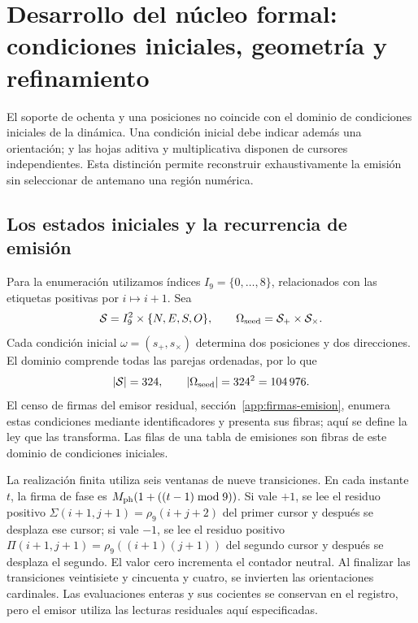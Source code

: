 \section{Desarrollo del núcleo formal: condiciones iniciales, geometría y refinamiento}
\label{sec:extension}

El soporte de ochenta y una posiciones no coincide con el dominio de condiciones iniciales de la dinámica. Una condición inicial debe indicar además una orientación; y las hojas aditiva y multiplicativa disponen de cursores independientes. Esta distinción permite reconstruir exhaustivamente la emisión sin seleccionar de antemano una región numérica.

\subsection{Los estados iniciales y la recurrencia de emisión}

Para la enumeración utilizamos índices \(I_9=\{0,\ldots,8\}\), relacionados con las etiquetas positivas por \(i\mapsto i+1\). Sea
\[
 \mathcal S=I_9^2\times\{N,E,S,O\},\qquad
 \Omega_{\rm seed}=\mathcal S_+\times\mathcal S_\times.
\]
Cada condición inicial \(\omega=(s_+,s_\times)\) determina dos posiciones y dos direcciones. El dominio comprende todas las parejas ordenadas, por lo que
\begin{equation}
 |\mathcal S|=324,\qquad |\Omega_{\rm seed}|=324^2=104\,976.
 \label{eq:semillas}
\end{equation}
El censo de firmas del emisor residual, sección~\ref{app:firmas-emision}, enumera estas condiciones mediante identificadores y presenta sus fibras; aquí se define la ley que las transforma. Las filas de una tabla de emisiones son fibras de este dominio de condiciones iniciales.

La realización finita utiliza seis ventanas de nueve transiciones. En cada instante \(t\), la firma de fase es \(M_{\rm ph}(1+((t-1)\bmod9))\). Si vale \(+1\), se lee el residuo positivo \(\Sigma(i+1,j+1)=\rho_9(i+j+2)\) del primer cursor y después se desplaza ese cursor; si vale \(-1\), se lee el residuo positivo \(\Pi(i+1,j+1)=\rho_9((i+1)(j+1))\) del segundo cursor y después se desplaza el segundo. El valor cero incrementa el contador neutral. Al finalizar las transiciones veintisiete y cincuenta y cuatro, se invierten las orientaciones cardinales. Las evaluaciones enteras y sus cocientes se conservan en el registro, pero el emisor utiliza las lecturas residuales aquí especificadas.

